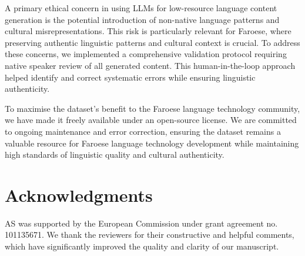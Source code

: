 \documentclass[11pt]{article}
\begin{document}
A primary ethical concern in using LLMs for low-resource language content generation is
the potential introduction of non-native language patterns and cultural
misrepresentations. This risk is particularly relevant for Faroese, where preserving
authentic linguistic patterns and cultural context is crucial. To address these
concerns, we implemented a comprehensive validation protocol requiring native speaker
review of all generated content. This human-in-the-loop approach helped identify and
correct systematic errors while ensuring linguistic authenticity.

To maximise the dataset's benefit to the Faroese language technology community, we have
made it freely available under an open-source license. We are committed to ongoing
maintenance and error correction, ensuring the dataset remains a valuable resource for
Faroese language technology development while maintaining high standards of linguistic
quality and cultural authenticity.


\section*{Acknowledgments}
\label{sec:acknowledgments}

AS was supported by the European Commission under grant agreement no. 101135671. We
thank the reviewers for their constructive and helpful comments, which have
significantly improved the quality and clarity of our manuscript.

\newpage


\end{document}
